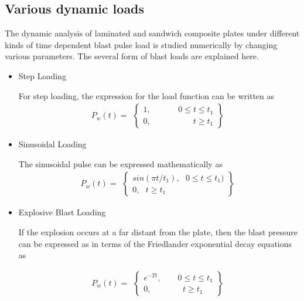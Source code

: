 \documentclass[3p,preprint,12pt]{elsarticle}
\begin{document}
\subsection{Various dynamic loads}
The dynamic analysis of laminated and sandwich composite plates under different kinds of time dependent blast pulse load \cite{kazanci2016review} is studied numerically by changing various parameters.	The several form of blast loads are explained here.
\begin{itemize}
	\item Step Loading
	
	For step loading, the expression for the load function can be written as
	\begin{equation} 
	P_{w}(t)=\begin{array}{cc}
	\left\{ \begin{array}{c}
	1,\,\,\,\,\,\,\,\,\,\,\,\,\,\,\,\,\,\,\,\,0\leq t\leq t_{1}\\
	0,\,\,\,\,\,\,\,\,\,\,\,\,\,\,\,\,\,\,\,\,\,\,\,\,\,\,\,\,\,\,\,t\geq t_{1}
	\end{array}\right\}  %
	\end{array}
	\end{equation}
	
	\item Sinusoidal Loading
	
	The sinusoidal pulse can be expressed mathematically as
	\begin{equation} 
	P_{w}(t)=\begin{array}{cc}
	\left\{ \begin{array}{c}
	sin(\pi t/t_{1}),\,\,\,\,0\leq t\leq t_{1})\\
	0,\,\,\,\,t\geq t_{1}
	\end{array}\right\}  %
	\end{array}
	\end{equation}
	
	\item Explosive Blast Loading
	
	If the explosion occurs at a far distant from the plate, then the blast pressure can be expressed as in terms of the Friedlander exponential decay equations as \cite{gupta1987dynamic}
	
	\begin{equation} 
	P_{w}(t)=\begin{array}{cc}
	\left\{ \begin{array}{c}
	e^{-\Upsilon t},\,\,\,\,\,\,\,\,\,\,\,\,0\leq t\leq t_{1}\\
	0,\,\,\,\,\,\,\,\,\,\,\,\,\,\,\,\,\,\,\,\,\,\,\,t\geq t_{1}
	\end{array}\right\}  %
	\end{array}
	\end{equation}
	

\end{itemize}
\end{document}
